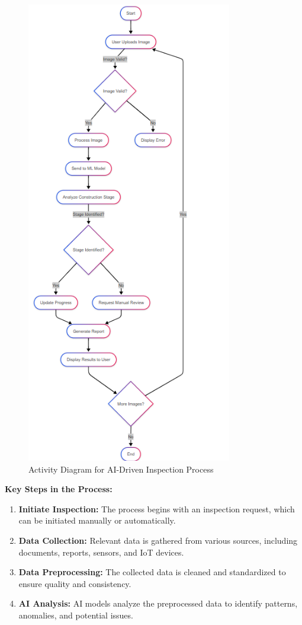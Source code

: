 \documentclass[12pt,a4paper]{report}
\begin{document}
\begin{figure}[H]
    \centering
    \includegraphics[width=0.8\textwidth]{images/activity diagram.PNG}
    \caption{Activity Diagram for AI-Driven Inspection Process}
    \label{fig:activity-diagram}
\end{figure}

\textbf{Key Steps in the Process:}
\begin{enumerate}
    \item \textbf{Initiate Inspection:} The process begins with an inspection request, which can be initiated manually or automatically.
    \item \textbf{Data Collection:} Relevant data is gathered from various sources, including documents, reports, sensors, and IoT devices.
    \item \textbf{Data Preprocessing:} The collected data is cleaned and standardized to ensure quality and consistency.
    \item \textbf{AI Analysis:} AI models analyze the preprocessed data to identify patterns, anomalies, and potential issues.
\end{enumerate}
\end{document}
